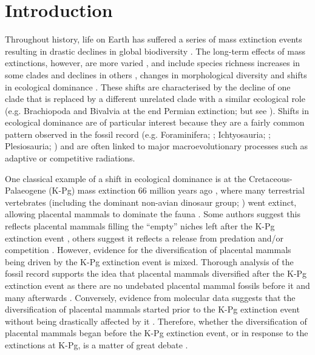 \section{Introduction}
Throughout history, life on Earth has suffered a series of mass extinction events resulting in drastic declines in global biodiversity \citep[e.g.][]{RaupPT,BentonPT,rennetime2013,Brusatte2015}.
The long-term effects of mass extinctions, however, are more varied \citep{Erwin1998344}, and include species richness increases in some clades \citep{friedmanexplosive2010} and declines in others \citep{Benton85}, changes in morphological diversity \citep{Ciampaglio2001,Ciampaglio2004,kornextinction2013} and shifts in ecological dominance \citep[e.g.][]{Brusatte12092008,toljagictriassic-jurassic2013,bensonfaunal2014}.
These shifts are characterised by the decline of one clade that is replaced by a different unrelated clade with a similar ecological role (e.g. Brachiopoda and Bivalvia at the end Permian extinction; \citealt{Liow2015} %
 but see \citealt{Payne22052014}). 
Shifts in ecological dominance are of particular interest because they are a fairly common pattern observed in the fossil record (e.g. Foraminifera; \citealt{Coxall01042006} %
; Ichtyosauria; \citealt{thorneresetting2011}; Plesiosauria; \citealt{bensonfaunal2014}) and are often linked to major macroevolutionary processes such as adaptive \citep{Losos2010} or competitive \citep{Brusatte12092008} radiations.

One classical example of a shift in ecological dominance is at the Cretaceous-Palaeogene (K-Pg) mass extinction 66 million years ago \citep{rennetime2013}, where many terrestrial vertebrates (including the dominant non-avian dinosaur group; \citealt{archibald2011extinction,rennetime2013,Brusatte2015}) went extinct, allowing placental mammals to dominate the fauna \citep{archibald2011extinction,Lovergrove}. 
Some authors suggest this reflects placental mammals filling the ``empty'' niches left after the K-Pg extinction event \citep{archibald2011extinction,O'Leary08022013}, others suggest it reflects a release from predation and/or competition \citep{Slater2012MEE,Lovergrove}.
However, evidence for the diversification of placental mammals being driven by the K-Pg extinction event is mixed.
Thorough analysis of the fossil record \citep[e.g.][]{goswamia2011,O'Leary08022013} supports the idea that placental mammals diversified after the K-Pg extinction event as there are no undebated placental mammal fossils before it and many afterwards \citep{archibald2011extinction,goswamia2011,Slater2012MEE,O'Leary08022013,Wilson2013,Brusatte2015}. 
Conversely, evidence from molecular data suggests that the diversification of placental mammals started prior to the K-Pg extinction event without being drastically affected by it \citep[e.g.][]{Douady2003285,bininda-emondsthe2007,meredithimpacts2011,Stadler12042011}.
Therefore, whether the diversification of placental mammals began before the K-Pg extinction event, or in response to the extinctions at K-Pg, is a matter of great debate \citep{dosReis2012,O'Leary08022013,Springer09082013,O'Leary08022013,dosReis2014}. 

